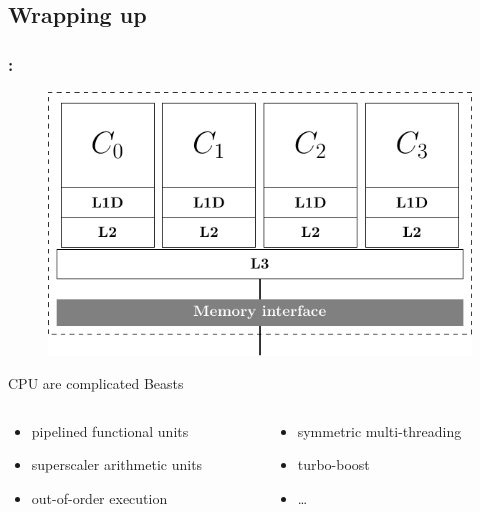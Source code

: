 \documentclass[9pt,xcolor=table]{beamer}
\begin{document}
\subsection{Wrapping up}
\begin{frame}
\frametitle{\insertsectionhead{}: \insertsubsection{}}
\begin{figure}[htb]
  \includegraphics[height=0.55\textheight]{tikz/cpu_schematic}
\end{figure}
\begin{block}{CPU are complicated Beasts}
  \begin{columns}[t]
    \begin{column}{.48\textwidth}
      \begin{itemize}
      \item pipelined functional units
      \item superscaler arithmetic units
      \item out-of-order execution
      \end{itemize}
    \end{column}
    \begin{column}{.48\textwidth}
      \begin{itemize}
      \item symmetric multi-threading
      \item turbo-boost
      \item \dots
      \end{itemize}
    \end{column}
  \end{columns}
\end{block}

\end{frame}
\end{document}
